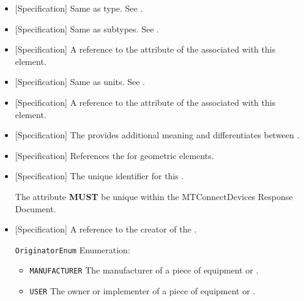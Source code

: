 \begin{itemize}

\item {}[Specification] \newline Same as  type. See .

\item {}[Specification] \newline Same as  subtypes. See .

\item {}[Specification] \newline A reference to the  attribute of the  associated with this element.

\item {}[Specification] \newline Same as  units. See .

\item {}[Specification] \newline A reference to the  attribute of the  associated with this element.

\item {}[Specification] \newline The  provides additional meaning and differentiates between .

\item {}[Specification] \newline References the  for geometric  elements.

\item {}[Specification] \newline The unique identifier for this .

The  attribute \textbf{MUST} be unique within the \gls{MTConnectDevices Response Document}.

\item {}[Specification] \newline A reference to the creator of the .

\texttt{OriginatorEnum} Enumeration:

\begin{itemize}
\item \texttt{MANUFACTURER} \newline The manufacturer of a piece of equipment or . 
\item \texttt{USER} \newline The owner or implementer of a piece of equipment or . 
\end{itemize}

\end{itemize}


